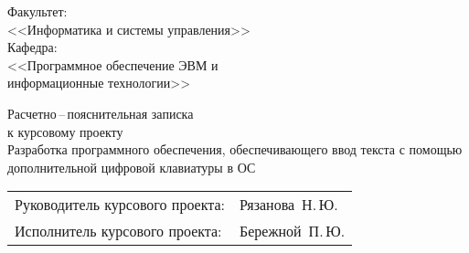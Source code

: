 \thispagestyle{fancy}


\vspace*{2cm}

\begin{flushright}
	\Large{ Факультет: }\\
	\large{ <<Информатика и системы управления>> }\\
	\Large{ Кафедра: }\\
	\large{ <<Программное обеспечение ЭВМ и\\ 
		информационные технологии>> }
\end{flushright}

\vspace{2cm}

\begin{LARGE} 
	\begin{center} 
		Расчетно\,--\,пояснительная записка\\
		к курсовому проекту\\ 
		\vspace{2cm}
		Разработка программного обеспечения, обеспечивающего ввод текста
		с помощью дополнительной цифровой клавиатуры в ОС
		\gnulinux 
	\end{center}
\end{LARGE}

\vspace{5cm}

\begin{flushright}
	\begin{tabular}{ll}
	Руководитель курсового проекта:&Рязанова~Н.\,Ю.\\
	Исполнитель курсового проекта:&Бережной~П.\,Ю.
	\end{tabular}
\end{flushright}

\newpage
\setcounter{page}{1}
